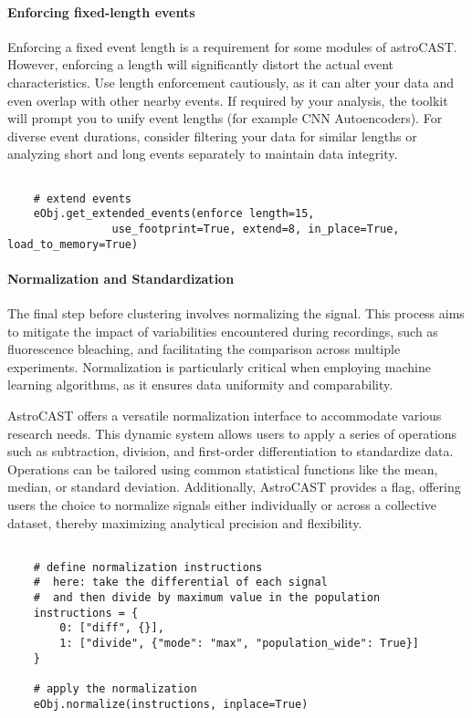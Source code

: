 \paragraph{Enforcing fixed-length events}
\label{par:enforcing-length}
Enforcing a fixed event length is a requirement for some modules of astroCAST. However, enforcing a length will significantly distort the actual event characteristics. Use length enforcement cautiously, as it can alter your data and even overlap with other nearby events. If required by your analysis, the toolkit will prompt you to unify event lengths (for example \ac{CNN} Autoencoders). For diverse event durations, consider filtering your data for similar lengths or analyzing short and long events separately to maintain data integrity.

\begin{lstlisting}[style=pyStyle]

    # extend events
    eObj.get_extended_events(enforce length=15,
                use_footprint=True, extend=8, in_place=True, load_to_memory=True)

\end{lstlisting}

\paragraph{Normalization and Standardization}
The final step before clustering involves normalizing the signal. This process aims to mitigate the impact of variabilities encountered during recordings, such as fluorescence bleaching, and facilitating the comparison across multiple experiments. Normalization is particularly critical when employing machine learning algorithms, as it ensures data uniformity and comparability.

AstroCAST offers a versatile normalization interface to accommodate various research needs. This dynamic system allows users to apply a series of operations such as subtraction, division, and first-order differentiation to standardize data. Operations can be tailored using common statistical functions like the mean, median, or standard deviation. Additionally, AstroCAST provides a  flag, offering users the choice to normalize signals either individually or across a collective dataset, thereby maximizing analytical precision and flexibility.

\begin{lstlisting}[style=pyStyle]

    # define normalization instructions
    #  here: take the differential of each signal
    #  and then divide by maximum value in the population
    instructions = {
        0: ["diff", {}],
        1: ["divide", {"mode": "max", "population_wide": True}]
    }

    # apply the normalization
    eObj.normalize(instructions, inplace=True)

\end{lstlisting}

